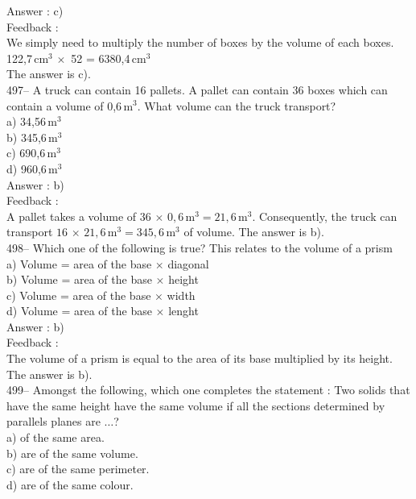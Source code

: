 \documentclass[letterpaper, 12pt]{article}
\begin{document}
Answer : c)\\

Feedback : \\
We simply need to multiply the number of boxes by the volume of each boxes.
\\
122,7\,cm$^{3}\,\times$ 52 = 6380,4\,cm$^{3}$\\
The answer is c).\\

497--  A truck can contain 16 pallets. A pallet can contain 36 boxes which can contain a volume of 0,6\,m$^{3}$. What volume can the truck transport?\\
a) 34,56\,m$^{3}$\\
b) 345,6\,m$^{3}$\\
c) 690,6\,m$^{3}$\\
d) 960,6\,m$^{3}$\\

Answer : b)\\

Feedback :\\
A pallet takes a volume of $36\,\times\,0,6$\,m$^{3}=21,6$\,m$^{3}$.
Consequently, the truck can transport $16\,\times\,21,6$\,m$^{3}=345,6$\,m$^{3}$ of volume.  The answer is b).\\

498-- Which one of the following is true? This relates to the volume of a prism\\
a) Volume = area of the base $\times$ diagonal\\
b) Volume = area of the base $\times$ height\\
c) Volume = area of the base $\times$ width\\
d) Volume = area of the base $\times$ lenght\\

Answer : b)\\

Feedback : \\
The volume of a prism is equal to the area of its base multiplied by its height.\\
The answer is b).\\

499-- Amongst the following, which one completes the statement : \og Two solids that have the same height have the same volume if all the sections determined by parallels planes are $\ldots$\fg ?\\
a) of the same area.\\
b) are of the same volume.\\
c) are of the same perimeter.\\
d) are of the same colour.\\
\end{document}
